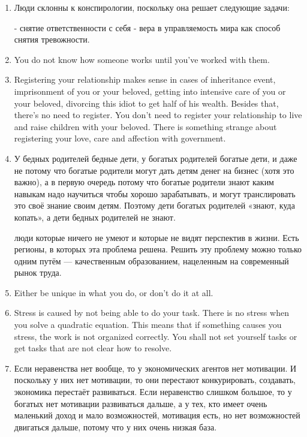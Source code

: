 \documentclass[11pt]{article}
\theoremstyle{remark}
\theoremstyle{definition}
\begin{document}
\begin{enumerate}
\item Люди склонны к конспирологии, поскольку она решает следующие задачи:

- снятие ответственности с себя
- вера в управляемость мира как способ снятия тревожности.



\item You do not know how someone works until you've worked with them.

\item Registering your relationship makes sense in cases of inheritance event, imprisonment of you or your beloved, getting into intensive care of you or your beloved, divorcing this idiot to get half of his wealth. Besides that, there's no need to register. You don't need to register your relationship to live and raise children with your beloved. There is something strange about registering your love, care and affection with government.


\item У бедных родителей бедные дети, у богатых родителей богатые дети, и даже не потому что богатые родители могут дать детям денег на бизнес (хотя это важно), а в первую очередь потому что богатые родители знают каким навыкам надо научиться чтобы хорошо зарабатывать, и могут транслировать это своё знание своим детям. Поэтому дети богатых родителей «знают, куда копать», а дети бедных родителей не знают.

люди которые ничего не умеют и которые не видят перспектив в жизни. Есть регионы, в которых эта проблема решена. Решить эту проблему можно только одним путём — качественным образованием, нацеленным на современный рынок труда. 


\item Either be unique in what you do, or don't do it at all.


\item Stress is caused by not being able to do your task. There is no stress when you solve a quadratic equation. This means that if something causes you stress, the work is not organized correctly. You shall not set yourself tasks or get tasks that are not clear how to resolve. 


\item Если неравенства нет вообще, то у экономических агентов нет мотивации. И поскольку у них нет мотивации, то они перестают конкурировать, создавать, экономика перестаёт развиваться. Если неравенство слишком большое, то у богатых нет мотивации развиваться дальше, а у тех, кто имеет очень маленький доход и мало возможностей, мотивация есть, но нет возможностей двигаться дальше, потому что у них очень низкая база.


\end{enumerate}
\end{document}
